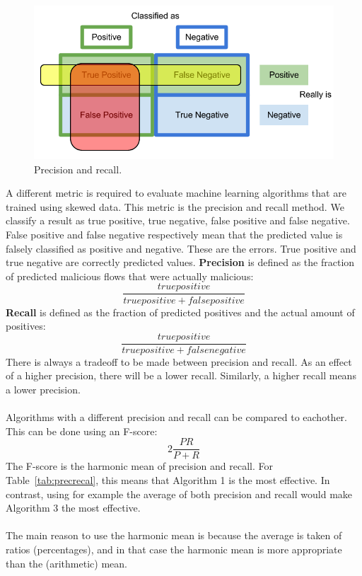 \begin{figure}[H]
\centering
\includegraphics[width=1\textwidth]{Figures/precisionrecall}
\decoRule
\caption[Precision and recall]{Precision and recall. \cite{recall-fig}}
\label{fig:precisionrecall}
\end{figure}
\noindent A different metric is required to evaluate machine learning algorithms that are trained using skewed data. This metric is the precision and recall method. We classify a result as true positive, true negative, false positive and false negative. False positive and false negative respectively mean that the predicted value is falsely classified as positive and negative. These are the errors. True positive and true negative are correctly predicted values. \textbf{Precision} is defined as the fraction of predicted malicious flows that were actually malicious: 
$$\dfrac{true positive}{true positive + false positive}$$
\textbf{Recall} is defined as the fraction of predicted positives and the actual amount of positives: 
$$\dfrac{true positive}{true positive + false negative}$$
There is always a tradeoff to be made between precision and recall. As an effect of a higher precision, there will be a lower recall. Similarly, a higher recall means a lower precision.\\\\
Algorithms with a different precision and recall can be compared to eachother. This can be done using an F-score: 
$$2 \dfrac{PR}{P+R}$$
\noindent The F-score is the harmonic mean of precision and recall. For Table~\ref{tab:precrecal}, this means that Algorithm 1 is the most effective. In contrast, using for example the average of both precision and recall would make Algorithm 3 the most effective.\\\\
The main reason to use the harmonic mean is because the average is taken of
ratios (percentages), and in that case the harmonic mean is more appropriate than the (arithmetic) mean. \cite{harmonic}
